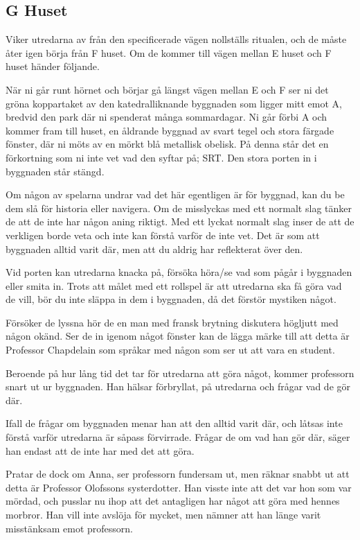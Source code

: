 \subsection{G Huset}
Viker utredarna av från den specificerade vägen nollställs ritualen, och de måste åter igen börja från F huset. Om de kommer till vägen mellan E huset och F huset händer följande.
%
\begin{displayquote}
	När ni går runt hörnet och börjar gå längst vägen mellan E och F ser ni det gröna koppartaket av den katedralliknande byggnaden som ligger mitt emot A, bredvid den park där ni spenderat många sommardagar. Ni går förbi A och kommer fram till huset, en åldrande byggnad av svart tegel och stora färgade fönster, där ni möts av en mörkt blå metallisk obelisk. På denna står det en förkortning som ni inte vet vad den syftar på; SRT. Den stora porten in i byggnaden står stängd.
\end{displayquote}
%
Om någon av spelarna undrar vad det här egentligen är för byggnad, kan du be dem slå för historia eller navigera. Om de misslyckas med ett normalt slag tänker de att de inte har någon aning riktigt. Med ett lyckat normalt slag inser de att de verkligen borde veta och inte kan förstå varför de inte vet. Det är som att byggnaden alltid varit där, men att du aldrig har reflekterat över den.

Vid porten kan utredarna knacka på, försöka höra/se vad som pågår i byggnaden eller smita in. Trots att målet med ett rollspel är att utredarna ska få göra vad de vill, bör du inte släppa in dem i byggnaden, då det förstör mystiken något.

Försöker de lyssna hör de en man med fransk brytning diskutera högljutt med någon okänd. Ser de in igenom något fönster kan de lägga märke till att detta är Professor Chapdelain \sectiondescribe{\ref{kar:MigelChapdelain}} som språkar med någon som ser ut att vara en student.

Beroende på hur lång tid det tar för utredarna att göra något, kommer professorn snart ut ur byggnaden. Han hälsar förbryllat, på utredarna och frågar vad de gör där.

Ifall de frågar om byggnaden menar han att den alltid varit där, och låtsas inte förstå varför utredarna är såpass förvirrade. Frågar de om vad han gör där, säger han endast att de inte har med det att göra.

Pratar de dock om Anna, ser professorn fundersam ut, men räknar snabbt ut att detta är Professor Olofssons systerdotter. Han visste inte att det var hon som var mördad, och pusslar nu ihop att det antagligen har något att göra med hennes morbror. Han vill inte avslöja för mycket, men nämner att han länge varit misstänksam emot professorn.

